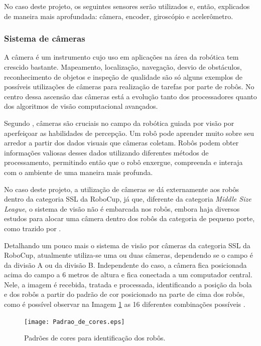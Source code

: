 \documentclass[acronym, symbols]{fei}
\begin{document}
			No caso deste projeto, os seguintes sensores serão utilizados e, então, explicados de maneira mais aprofundada: câmera, encoder, giroscópio e acelerômetro.
			
			\subsubsection{Sistema de câmeras}
			
				A câmera é um instrumento cujo uso em aplicações na área da robótica tem crescido bastante. Mapeamento, localização, navegação, desvio de obstáculos, reconhecimento de objetos e inspeção de qualidade são só alguns exemplos de possíveis utilizações de câmeras para realização de tarefas por parte de robôs. No centro dessa ascensão das câmeras está a evolução tanto dos processadores quanto dos algoritmos de visão computacional avançados.
				
				Segundo \textcite{cameras_technexion}, câmeras são cruciais no campo da robótica guiada por visão por aperfeiçoar as habilidades de percepção. Um robô pode aprender muito sobre seu arredor a partir dos dados visuais que câmeras coletam. Robôs podem obter informações valiosas desses dados utilizando diferentes métodos de processamento, permitindo então que o robô enxergue, compreenda e interaja com o ambiente de uma maneira mais profunda.
				
				No caso deste projeto, a utilização de câmeras se dá externamente aos robôs dentro da categoria SSL da RoboCup, já que, diferente da categoria \textit{Middle Size League}, o sistema de visão não é embarcada nos robôs, embora haja diversos estudos para alocar uma câmera dentro dos robôs da categoria de pequeno porte, como trazido por \textcite{melo2022embedded}.
				
				Detalhando um pouco mais o sistema de visão por câmeras da categoria SSL da RoboCup, atualmente utiliza-se uma ou duas câmeras, dependendo se o campo é da divisão A ou da divisão B. Independente do caso, a câmera fica posicionada acima do campo a 6 metros de altura e fica conectada a um computador central. Nele, a imagem é recebida, tratada e processada, identificando a posição da bola e dos robôs a partir do padrão de cor posicionado na parte de cima dos robôs, como é possível observar na Imagem \ref{fig:color_patterns} as 16 diferentes combinações possíveis \cite{10.1007/978-3-642-11876-0_37}.
				
				\begin{figure}[!htb]
					\centering
					\caption{Padrões de cores para identificação dos robôs.} 
					\texttt{[image: Padrao\_de\_cores.eps]}
					\label{fig:color_patterns}
				\end{figure}
			
\end{document}
